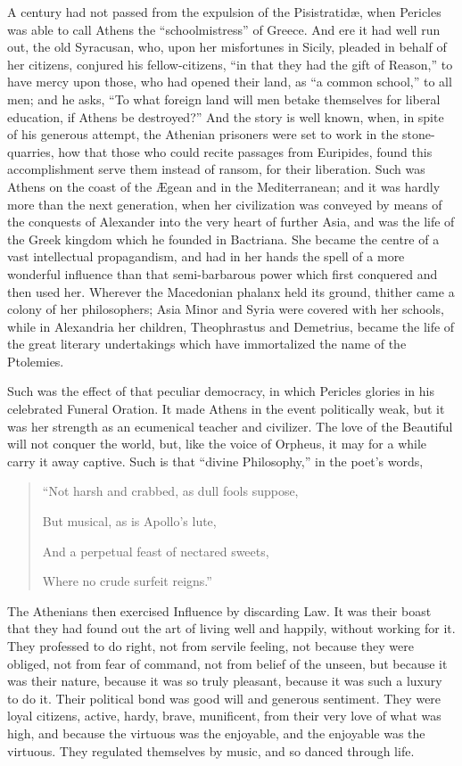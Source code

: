 A century had not passed from the expulsion of the Pisistratidæ,
when Pericles was able to call Athens the ``schoolmistress''
of Greece. And ere it had well run out, the old Syracusan, who, upon
her misfortunes in Sicily, pleaded in behalf of her citizens, conjured
his fellow-citizens, ``in that they had the gift of Reason,''
to have mercy upon those, who had opened their land, as ``a common
school,'' to all men; and he asks, ``To what foreign land will
men betake themselves for liberal education, if Athens be
destroyed?'' And the story is well known, when, in spite of his
generous attempt, the Athenian prisoners were set to work in the
stone-quarries, how that those who could recite passages from
Euripides, found this accomplishment serve them instead of ransom, for
their liberation. Such was Athens on the coast of the Ægean and in
the Mediterranean; and it was hardly more than the next generation,
when her civilization was conveyed by means of the conquests of
Alexander into the very heart of further Asia, and was the life of the
Greek kingdom which he founded in Bactriana. She became the centre of
a vast intellectual propagandism, and had in her hands the spell of a
more wonderful influence than that semi-barbarous power which first
conquered and then used her. Wherever the Macedonian phalanx held its
ground, thither came a colony of her philosophers; Asia Minor and
Syria were covered with her schools, while in Alexandria her children,
Theophrastus and Demetrius, became the life of the great literary
undertakings which have immortalized the name of the Ptolemies.

Such was the effect of that peculiar democracy, in which Pericles
glories in his celebrated Funeral Oration. It made Athens in the event
politically weak, but it was her strength as an ecumenical teacher and
civilizer. The love of the Beautiful will not conquer the world,
but, like the voice of Orpheus, it may for a while carry it away
captive. Such is that ``divine Philosophy,'' in the poet's
words,

\begin{quote}

``Not harsh and crabbed, as dull fools suppose,

But musical, as is Apollo's lute,

And a perpetual feast of nectared sweets,

Where no crude surfeit reigns.''

\end{quote}

The Athenians then exercised Influence by discarding Law. It was
their boast that they had found out the art of living well and
happily, without working for it. They professed to do right, not from
servile feeling, not because they were obliged, not from fear of
command, not from belief of the unseen, but because it was their
nature, because it was so truly pleasant, because it was such a luxury
to do it. Their political bond was good will and generous sentiment.
They were loyal citizens, active, hardy, brave, munificent, from their
very love of what was high, and because the virtuous was the
enjoyable, and the enjoyable was the virtuous. They regulated
themselves by music, and so danced through life.

